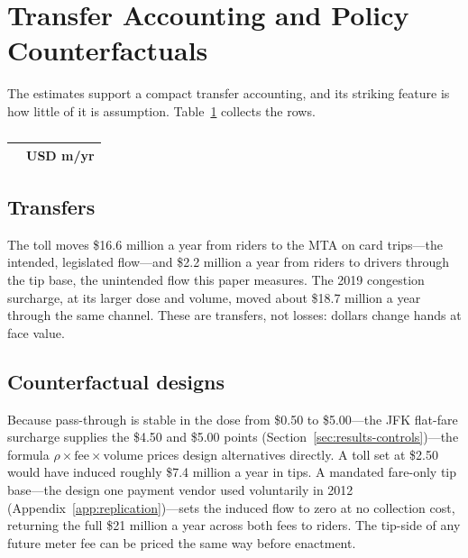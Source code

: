 \section{Transfer Accounting and Policy Counterfactuals}
\label{sec:counterfactuals}

The estimates support a compact transfer accounting, and its striking
feature is how little of it is assumption. Table~\ref{tab:welfare}
collects the rows.

\begin{table}[!htbp]
  \centering
  \singlespacing
  \caption{}
  \label{tab:welfare}
  \small
  \begin{tabular}{@{}p{}r@{}}
    \toprule
    & USD m/yr \\
    \midrule
    
    \bottomrule
  \end{tabular}
\end{table}

\subsection{Transfers}
The toll moves \$16.6 million a year from riders to the MTA on card
trips---the intended, legislated flow---and \$2.2 million a year from
riders to drivers through the tip base, the unintended flow this paper
measures. The 2019 congestion surcharge, at its larger dose and volume,
moved about \$18.7 million a year through the same channel. These are
transfers, not losses: dollars change hands at face value.

\subsection{Counterfactual designs}
Because pass-through is stable in the dose from \$0.50 to \$5.00---the
JFK flat-fare surcharge supplies the \$4.50 and \$5.00 points
(Section~\ref{sec:results-controls})---the formula
$\rho \times \text{fee} \times \text{volume}$ prices design
alternatives directly. A toll set at \$2.50 would have induced roughly
\$7.4 million a year in tips. A mandated fare-only tip base---the
design one payment vendor used voluntarily in 2012
(Appendix~\ref{app:replication})---sets the induced flow to zero at no
collection cost, returning the full \$21 million a year across both
fees to riders. The tip-side of any future meter fee can be priced the
same way before enactment.

